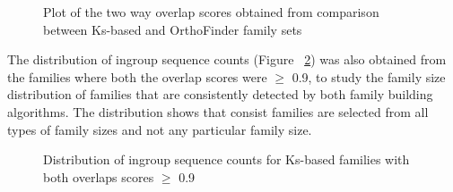 \documentclass{article}
\begin{document}
		\begin{figure}[h!]
			\caption{Plot of the two way overlap scores obtained from comparison between Ks-based and OrthoFinder family sets}
			\label{fig:scatter_lgf5_vs_orthofinder_overlap_lgf5}
		\end{figure}
		
		The distribution of ingroup sequence counts (Figure ~\ref{fig:hist_seq_ct_lgf5_vs_orthofinder_90percent_overlap}) was also obtained from the families where both the overlap scores were $\geq$ 0.9, to study the family size distribution of families that are consistently detected by both family building algorithms. The distribution shows that consist families are selected from all types of family sizes and not any particular family size.
		
		\begin{figure}[h!]
			\caption{Distribution of ingroup sequence counts for Ks-based families with both overlaps scores $\geq$ 0.9 }
			\label{fig:hist_seq_ct_lgf5_vs_orthofinder_90percent_overlap}
		\end{figure}
		
\end{document}
